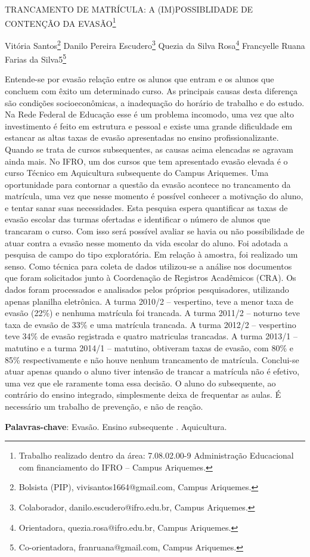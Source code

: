 \documentclass[article,12pt,onesidea,4paper,english,brazil]{abntex2}
\begin{document}
	
	
	\frenchspacing 
	
	\begin{center}
		\LARGE TRANCAMENTO DE MATRÍCULA: A (IM)POSSIBLIDADE DE CONTENÇÃO DA EVASÃO\footnote{Trabalho realizado dentro da área: 7.08.02.00-9 Administração Educacional com financiamento do IFRO – Campus Ariquemes.}
		
		\normalsize
		Vitória Santos\footnote{Bolsista (PIP), vivisantos1664@gmail.com, Campus Ariquemes.} 
	Danilo Pereira Escudero\footnote{Colaborador, danilo.escudero@ifro.edu.br, Campus Ariquemes.} 
	Quezia da Silva Rosa\footnote{Orientadora, quezia.rosa@ifro.edu.br, Campus Ariquemes.} 
	Francyelle Ruana Farias da Silva5\footnote{Co-orientadora, franruana@gmail.com, Campus Ariquemes.} 
	\end{center}
	
	\noindent Entende-se por evasão relação entre os alunos que entram e os alunos que concluem com êxito um determinado curso. As principais causas desta diferença são condições socioeconômicas, a inadequação do horário de trabalho e do estudo. Na Rede Federal de Educação esse é um problema incomodo, uma vez que alto investimento é feito em estrutura e pessoal e existe uma grande dificuldade em estancar as altas taxas de evasão apresentadas no ensino profissionalizante. Quando se trata de cursos subsequentes, as causas acima elencadas se agravam ainda mais. No IFRO, um dos cursos que tem apresentado evasão elevada é o curso Técnico em Aquicultura subsequente do Campus Ariquemes. Uma oportunidade para contornar a questão da evasão acontece no trancamento da matrícula, uma vez que nesse momento é possível conhecer a motivação do aluno, e tentar sanar suas necessidades. Esta pesquisa espera quantificar as taxas de evasão escolar das turmas ofertadas e identificar o número de alunos que trancaram o curso. Com isso será possível avaliar se havia ou não possibilidade de atuar contra a evasão nesse momento da vida escolar do aluno. Foi adotada a pesquisa de campo do tipo exploratória. Em relação à amostra, foi realizado um senso. Como técnica para coleta de dados utilizou-se a análise nos documentos que foram solicitados junto à Coordenação de Registros Acadêmicos (CRA). Os dados foram processados e analisados pelos próprios pesquisadores, utilizando apenas planilha eletrônica. A turma 2010/2 – vespertino, teve a menor taxa de evasão (22\%) e nenhuma matrícula foi trancada. A turma 2011/2 – noturno teve taxa de evasão de 33\% e uma matrícula trancada. A turma 2012/2 – vespertino teve 34\% de evasão registrada e quatro matriculas trancadas. A turma 2013/1 – matutino e a turma 2014/1 – matutino, obtiveram taxas de evasão, com 80\% e 85\% respectivamente e não houve nenhum trancamento de matrícula. Conclui-se atuar apenas quando o aluno tiver intensão de trancar a matrícula não é efetivo, uma vez que ele raramente toma essa decisão. O aluno do subsequente, ao contrário do ensino integrado, simplesmente deixa de frequentar as aulas. É necessário um trabalho de prevenção, e não de reação.
	
	\vspace{\onelineskip}
	
	\noindent
	\textbf{Palavras-chave}: Evasão. Ensino subsequente . Aquicultura.
	
\end{document}

